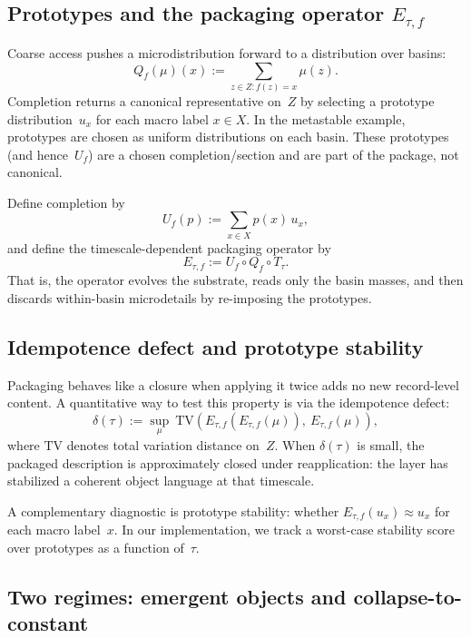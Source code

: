 \documentclass[11pt]{article}
\begin{document}
\subsection{Prototypes and the packaging operator $E_{\tau,f}$}

Coarse access pushes a microdistribution forward to a distribution over basins:
\[
Q_f(\mu)(x) := \sum_{z\in Z: f(z)=x} \mu(z).
\]
Completion returns a canonical representative on~$Z$ by selecting a prototype distribution~$u_x$ for each macro label $x\in X$.
In the metastable example, prototypes are chosen as uniform distributions on each basin.
These prototypes (and hence~$U_f$) are a chosen completion/section and are part of the package, not canonical.

Define completion by
\[
U_f(p) := \sum_{x\in X} p(x)\,u_x,
\]
and define the timescale-dependent packaging operator by
\[
E_{\tau,f} := U_f \circ Q_f \circ T_\tau.
\]
That is, the operator evolves the substrate, reads only the basin masses, and then discards within-basin microdetails by re-imposing the prototypes.

\subsection{Idempotence defect and prototype stability}

Packaging behaves like a closure when applying it twice adds no new record-level content.
A quantitative way to test this property is via the idempotence defect:
\[
\delta(\tau) := \sup_{\mu}\ \mathrm{TV}\!\left(E_{\tau,f}(E_{\tau,f}(\mu)),\ E_{\tau,f}(\mu)\right),
\]
where $\mathrm{TV}$ denotes total variation distance on~$Z$.
When $\delta(\tau)$ is small, the packaged description is approximately closed under reapplication: the layer has stabilized a coherent object language at that timescale.

A complementary diagnostic is prototype stability: whether $E_{\tau,f}(u_x)\approx u_x$ for each macro label~$x$.
In our implementation, we track a worst-case stability score over prototypes as a function of~$\tau$.

\subsection{Two regimes: emergent objects and collapse-to-constant}
\end{document}
